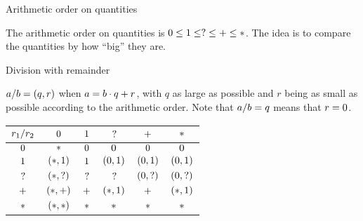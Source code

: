 \begin{frame}{Arithmetic order on quantities}

The arithmetic order on quantities is $\Zero \learithqty \One \learithqty \Few \learithqty \Many \learithqty \Any$. The idea is to compare the quantities by how ``big'' they are.

\end{frame}

\begin{frame}{Division with remainder}

$a / b = (q, r)$ when $a = b \cdot q + r$, with $q$ as large as possible and $r$ being as small as possible according to the arithmetic order. Note that $a / b = q$ means that $r = 0$.

\vspace{2em}

\begin{table}[ht]
  \centering
  \begin{tabular}{|c|c|c|c|c|c|}
  \hline
  $r_1 / r_2$ & $0$         & $1$  & $?$          & $+$         & $*$          \\ \hline
  $0$             & $*$          & $0$ & $0$         & $0$         & $0$         \\ \hline
  $1$              & $(*, 1)$  & $1$  & $(0, 1)$ & $(0, 1)$ & $(0, 1)$ \\ \hline
  $?$              & $(*, ?)$  & $?$  & $?$          & $(0, ?)$ & $(0, ?)$ \\ \hline
  $+$             & $(*, +)$ & $+$ & $(*, 1)$  & $+$         & $(*, 1)$  \\ \hline
  $*$              & $(*, *)$  & $*$  & $*$          & $*$          & $*$          \\ \hline
  \end{tabular}
\end{table}

\end{frame}
